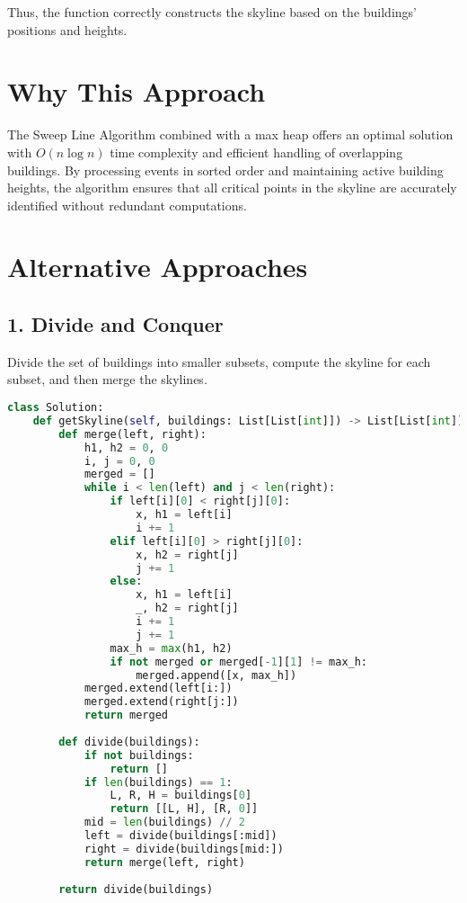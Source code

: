 Thus, the function correctly constructs the skyline based on the buildings' positions and heights.

\section*{Why This Approach}

The Sweep Line Algorithm combined with a max heap offers an optimal solution with \(O(n \log n)\) time complexity and efficient handling of overlapping buildings. By processing events in sorted order and maintaining active building heights, the algorithm ensures that all critical points in the skyline are accurately identified without redundant computations.

\section*{Alternative Approaches}

\subsection*{1. Divide and Conquer}

Divide the set of buildings into smaller subsets, compute the skyline for each subset, and then merge the skylines.

\begin{lstlisting}[language=Python]
class Solution:
    def getSkyline(self, buildings: List[List[int]]) -> List[List[int]]:
        def merge(left, right):
            h1, h2 = 0, 0
            i, j = 0, 0
            merged = []
            while i < len(left) and j < len(right):
                if left[i][0] < right[j][0]:
                    x, h1 = left[i]
                    i += 1
                elif left[i][0] > right[j][0]:
                    x, h2 = right[j]
                    j += 1
                else:
                    x, h1 = left[i]
                    _, h2 = right[j]
                    i += 1
                    j += 1
                max_h = max(h1, h2)
                if not merged or merged[-1][1] != max_h:
                    merged.append([x, max_h])
            merged.extend(left[i:])
            merged.extend(right[j:])
            return merged
        
        def divide(buildings):
            if not buildings:
                return []
            if len(buildings) == 1:
                L, R, H = buildings[0]
                return [[L, H], [R, 0]]
            mid = len(buildings) // 2
            left = divide(buildings[:mid])
            right = divide(buildings[mid:])
            return merge(left, right)
        
        return divide(buildings)
\end{lstlisting}

